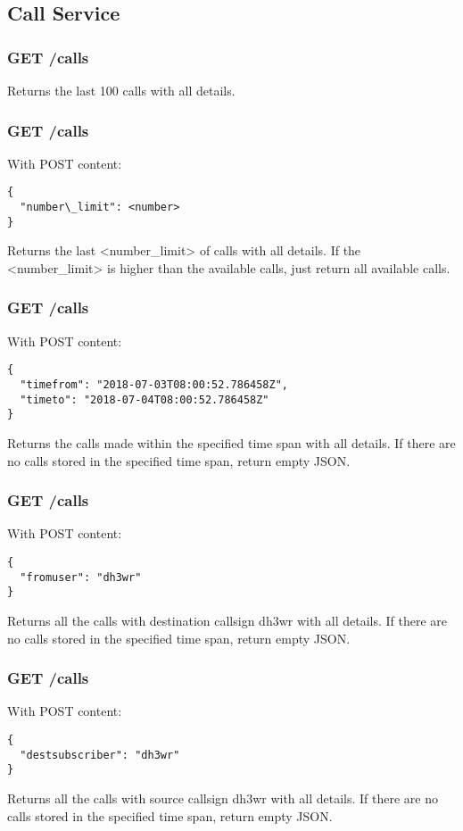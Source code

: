 \subsection{Call Service}

\subsubsection{GET /calls}
Returns the last 100 calls with all details.

\subsubsection{GET /calls}
With POST content:
\begin{lstlisting}
{
  "number\_limit": <number>
}
\end{lstlisting}

Returns the last <number\_limit> of calls with all details. If the <number\_limit> is higher than the available calls, just return all available calls.

\subsubsection{GET /calls}
With POST content:
\begin{lstlisting}
{
  "timefrom": "2018-07-03T08:00:52.786458Z",
  "timeto": "2018-07-04T08:00:52.786458Z"
}
\end{lstlisting}
Returns the calls made within the specified time span with all details. If there are no calls stored in the specified time span, return empty JSON.

\subsubsection{GET /calls}
With POST content:
\begin{lstlisting}
{
  "fromuser": "dh3wr"
}
\end{lstlisting}
Returns all the calls with destination callsign dh3wr with all details. If there are no calls stored in the specified time span, return empty JSON.

\subsubsection{GET /calls}
With POST content:
\begin{lstlisting}
{
  "destsubscriber": "dh3wr"
}
\end{lstlisting}
Returns all the calls with source callsign dh3wr with all details. If there are no calls stored in the specified time span, return empty JSON.

